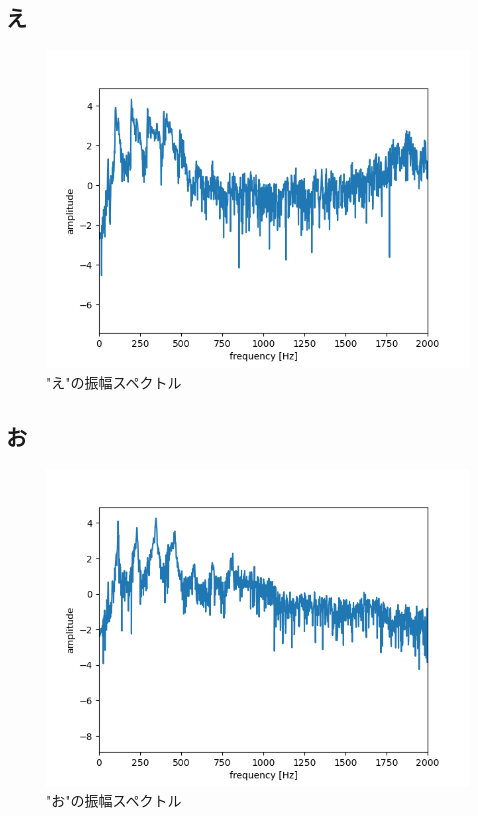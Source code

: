 \documentclass[a4paper,11pt]{jsarticle}
\begin{document}
\subsection*{え}
\begin{figure}[H]
  \centering
  \includegraphics[scale=0.5]{../ex02/img/plot-spectrum-2000_e.png}
  \caption{"え"の振幅スペクトル}
  \label{spectrum_e}
\end{figure}

\subsection*{お}
\begin{figure}[H]
  \centering
  \includegraphics[scale=0.5]{../ex02/img/plot-spectrum-2000_o.png}
  \caption{"お"の振幅スペクトル}
  \label{spectrum_o}
\end{figure}
\end{document}
